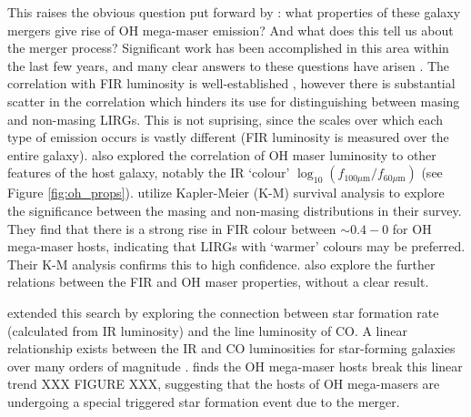 This raises the obvious question put forward by \citet{lo2005}: what properties of these galaxy mergers give rise of OH mega-maser emission? And what does this tell us about the merger process? Significant work has been accomplished in this area within the last few years, and many clear answers to these questions have arisen \citep{darling2012}. The correlation with FIR luminosity is well-established \citep{darling2002_paperIII}, however there is substantial scatter in the correlation which hinders its use for distinguishing between masing and non-masing LIRGs. This is not suprising, since the scales over which each type of emission occurs is vastly different (FIR luminosity is measured over the entire galaxy). \citet{darling2002_paperIII} also explored the correlation of OH maser luminosity to other features of the host galaxy, notably the IR `colour' $\log_{10}(f_{100\mu\mathrm{m}}/f_{60\mu\mathrm{m}})$ (see Figure \ref{fig:oh_props}). \citet{darling2002_paperIII} utilize Kapler-Meier (K-M) survival analysis \citep{Feigelson_1985} to explore the significance between the masing and non-masing distributions in their survey. They find that there is a strong rise in FIR colour between $\sim0.4-0$ for OH mega-maser hosts, indicating that LIRGs with `warmer' colours may be preferred. Their K-M analysis confirms this to high confidence. \citet{darling2002_paperIII} also explore the further relations between the FIR and OH maser properties, without a clear result. 

\cite{Darling_2007} extended this search by exploring the connection between star formation rate (calculated from IR luminosity) and the line luminosity of CO. A linear relationship exists between the IR and CO luminosities for star-forming galaxies over many orders of magnitude \citep{Gao_2004}. \citet{Darling_2007} finds the OH mega-maser hosts break this linear trend XXX FIGURE XXX, suggesting that the hosts of OH mega-masers are undergoing a special triggered star formation event due to the merger.

